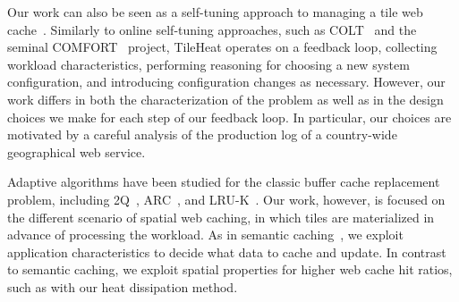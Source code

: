 \documentclass[11pt, oneside]{report}
\begin{document}
Our work can also be seen as a self-tuning approach to managing a tile web cache~\cite{CN07:SelfTuning10YrPaper}. Similarly to online self-tuning approaches, such as COLT~\cite{SAMP07:COLT} and the seminal COMFORT~\cite{WHMZ94:COMFORT} project, TileHeat operates on a feedback loop, collecting workload characteristics, performing reasoning for choosing a new system configuration, and introducing configuration changes as necessary. However, our work differs in both the characterization of the problem as well as in the design choices we make for each step of our feedback loop. 
In particular, our choices are motivated by a careful analysis of the production log of a country-wide geographical web service. 

Adaptive algorithms have been studied for the classic buffer cache replacement problem, including 2Q~\cite{JS94:2Q}, ARC~\cite{MM03:ARC}, and LRU-K~\cite{OOW93:LRU-K}. Our work, however, is focused on the different scenario of spatial web caching, in which tiles are materialized in advance of processing the workload.
As in semantic caching~\cite{DFJ+96:SemanticCaching}, we exploit application characteristics to decide what data to cache and update. In contrast to semantic caching, we exploit spatial properties for higher web cache hit ratios, such as with our heat dissipation method. 
	
\end{document}
